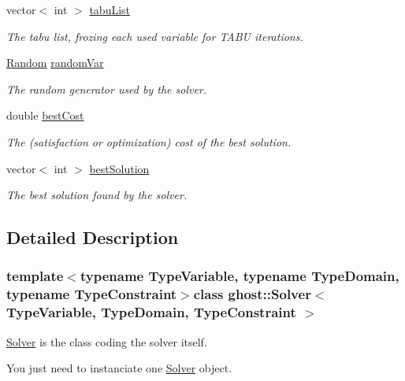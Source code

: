 \begin{DoxyCompactItemize}
vector$<$ int $>$ \hyperlink{classghost_1_1Solver_aa5c12894a6fbd524fb33906c8f3fbcae}{tabu\-List}
\begin{DoxyCompactList}\small\item\em The tabu list, frozing each used variable for T\-A\-B\-U iterations. \end{DoxyCompactList}\item 
\hyperlink{classghost_1_1Random}{Random} \hyperlink{classghost_1_1Solver_acec87a0a0adcc3a8d794a1ff84718201}{random\-Var}
\begin{DoxyCompactList}\small\item\em The random generator used by the solver. \end{DoxyCompactList}\item 
double \hyperlink{classghost_1_1Solver_a2fa5cf25d3417e3046aad3c1123320ed}{best\-Cost}
\begin{DoxyCompactList}\small\item\em The (satisfaction or optimization) cost of the best solution. \end{DoxyCompactList}\item 
vector$<$ int $>$ \hyperlink{classghost_1_1Solver_aea123e5069f4a6d20528b23a4e99d41d}{best\-Solution}
\begin{DoxyCompactList}\small\item\em The best solution found by the solver. \end{DoxyCompactList}\end{DoxyCompactItemize}


\subsection{Detailed Description}
\subsubsection*{template$<$typename Type\-Variable, typename Type\-Domain, typename Type\-Constraint$>$class ghost\-::\-Solver$<$ Type\-Variable, Type\-Domain, Type\-Constraint $>$}

\hyperlink{classghost_1_1Solver}{Solver} is the class coding the solver itself. 

You just need to instanciate one \hyperlink{classghost_1_1Solver}{Solver} object.

